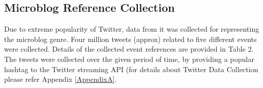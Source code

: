 

\subsection{Microblog Reference Collection}

Due to extreme popularity of Twitter, data from it was collected for representing the microblog genre. Four million tweets (approx) related to five different events were collected. Details of the collected event references are provided in Table 2. The tweets were collected over the given period of time, by providing a popular hashtag to the Twitter streaming API  (for details about Twitter Data Collection please refer Appendix \ref{AppendixA}.

